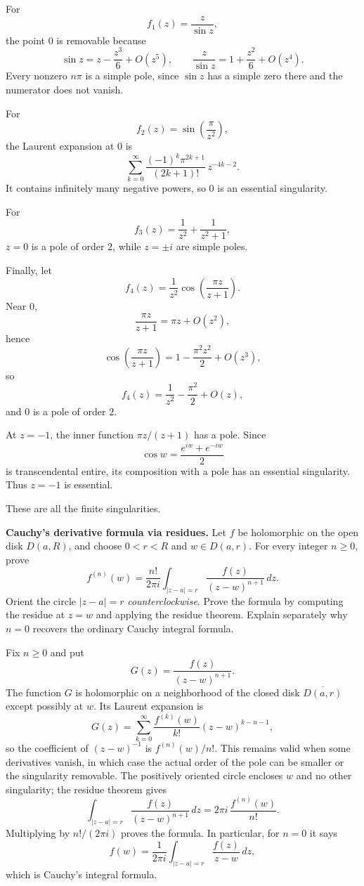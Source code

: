 \begin{solution}
For
\[
f_1(z)=\frac{z}{\sin z},
\]
the point \(0\) is removable because
\[
\sin z=z-\frac{z^3}{6}+O(z^5),
\qquad
\frac{z}{\sin z}=1+\frac{z^2}{6}+O(z^4).
\]
Every nonzero \(n\pi\) is a simple pole, since \(\sin z\) has a simple zero there and the numerator does not vanish.

For
\[
f_2(z)=\sin\!\left(\frac{\pi}{z^2}\right),
\]
the Laurent expansion at \(0\) is
\[
\sum_{k=0}^{\infty}
\frac{(-1)^k\pi^{2k+1}}{(2k+1)!}\,z^{-4k-2}.
\]
It contains infinitely many negative powers, so \(0\) is an essential singularity.

For
\[
f_3(z)=\frac1{z^2}+\frac1{z^2+1},
\]
\(z=0\) is a pole of order \(2\), while \(z=\pm i\) are simple poles.

Finally, let
\[
f_4(z)=\frac1{z^2}
\cos\!\left(\frac{\pi z}{z+1}\right).
\]
Near \(0\),
\[
\frac{\pi z}{z+1}=\pi z+O(z^2),
\]
hence
\[
\cos\!\left(\frac{\pi z}{z+1}\right)
=
1-\frac{\pi^2z^2}{2}+O(z^3),
\]
so
\[
f_4(z)=\frac1{z^2}-\frac{\pi^2}{2}+O(z),
\]
and \(0\) is a pole of order \(2\).

At \(z=-1\), the inner function \(\pi z/(z+1)\) has a pole. Since
\[
\cos w=\frac{e^{iw}+e^{-iw}}2
\]
is transcendental entire, its composition with a pole has an essential singularity. Thus \(z=-1\) is essential.

These are all the finite singularities.
\end{solution}


\begin{problem}[CP-IV-0029]
\label{prob:cp-iv-0029}
\textbf{Cauchy's derivative formula via residues.}
Let $f$ be holomorphic on the open disk $D(a,R)$, and choose
$0<r<R$ and $w\in D(a,r)$. For every integer $n\ge0$, prove
\[
\boxed{\quad f^{(n)}(w)=\frac{n!}{2\pi i}
\int_{|z-a|=r}\frac{f(z)}{(z-w)^{n+1}}\,dz.\quad}
\]
Orient the circle $|z-a|=r$ \emph{counterclockwise}. Prove the
formula by computing the residue at $z=w$ and applying the residue
theorem. Explain separately why $n=0$ recovers the ordinary Cauchy
integral formula.
\end{problem}



\begin{solution}
Fix $n\ge0$ and put
\[
G(z)=\frac{f(z)}{(z-w)^{n+1}}.
\]
The function $G$ is holomorphic on a neighborhood of the closed disk
$\overline{D(a,r)}$ except possibly at $w$. Its Laurent expansion is
\[
G(z)=\sum_{k=0}^{\infty}\frac{f^{(k)}(w)}{k!}
                      (z-w)^{k-n-1},
\]
so the coefficient of $(z-w)^{-1}$ is $f^{(n)}(w)/n!$.
This remains valid when some derivatives vanish, in which case the
actual order of the pole can be smaller or the singularity removable.
The positively oriented circle encloses $w$ and no other singularity;
the residue theorem gives
\[
\int_{|z-a|=r}\frac{f(z)}{(z-w)^{n+1}}\,dz
=2\pi i\,\frac{f^{(n)}(w)}{n!}.
\]
Multiplying by $n!/(2\pi i)$ proves the formula. In particular,
for $n=0$ it says
\[
f(w)=\frac{1}{2\pi i}\int_{|z-a|=r}\frac{f(z)}{z-w}\,dz,
\]
which is Cauchy's integral formula.
\end{solution}

